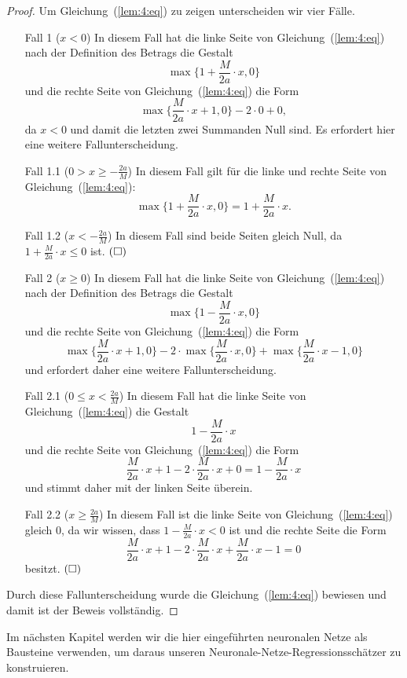 \begin{proof}
Um Gleichung~(\ref{lem:4:eq}) zu zeigen unterscheiden wir vier Fälle.
  \begin{itemize}
  \item[Fall 1] ($x < 0$) In diesem Fall hat die linke Seite von Gleichung~(\ref{lem:4:eq}) nach der Definition des Betrags die Gestalt $$\max\bigg\{1 + \frac{M}{2a} \cdot x, 0\bigg\}$$ und die rechte Seite von Gleichung~(\ref{lem:4:eq}) die Form $$\max\bigg\{\frac{M}{2a} \cdot x + 1, 0\bigg\} - 2 \cdot 0 + 0,$$ da $x < 0$ und damit die letzten zwei Summanden Null sind. Es erfordert hier eine weitere Fallunterscheidung.
 \item[Fall 1.1] ($0 > x \geq -\frac{2a}{M}$) In diesem Fall gilt für die linke und rechte Seite von Gleichung~(\ref{lem:4:eq}):
 $$\max\bigg\{1 + \frac{M}{2a} \cdot x, 0\bigg\} = 1 + \frac{M}{2a} \cdot x.$$
 \item[Fall 1.2] ($x < -\frac{2a}{M}$) In diesem Fall sind beide Seiten gleich Null, da $1 + \frac{M}{2a} \cdot x \leq 0$ ist. $\hfill(\square)$
  \item[Fall 2] ($x \geq 0$) In diesem Fall hat die linke Seite von Gleichung~(\ref{lem:4:eq}) nach der Definition des Betrags die Gestalt $$\max\bigg\{1 - \frac{M}{2a} \cdot x, 0\bigg\}$$ und die rechte Seite von Gleichung~(\ref{lem:4:eq}) die Form $$\max\bigg\{\frac{M}{2a} \cdot x + 1, 0\bigg\} - 2 \cdot \max\bigg\{\frac{M}{2a} \cdot x, 0\bigg\} + \max\bigg\{\frac{M}{2a} \cdot x - 1, 0\bigg\}$$ und erfordert daher eine weitere Fallunterscheidung.
 \item[Fall 2.1] ($0 \leq x < \frac{2a}{M}$) In diesem Fall hat die linke Seite von Gleichung~(\ref{lem:4:eq}) die Gestalt $$1 - \frac{M}{2a} \cdot x$$ und die rechte Seite von Gleichung~(\ref{lem:4:eq}) die Form $$\frac{M}{2a} \cdot x + 1 - 2 \cdot \frac{M}{2a} \cdot x + 0 = 1 - \frac{M}{2a} \cdot x$$ und stimmt daher mit der linken Seite überein.
 \item[Fall 2.2] ($x \geq \frac{2a}{M}$) In diesem Fall ist die linke Seite von Gleichung~(\ref{lem:4:eq}) gleich 0, da wir wissen, dass $1 - \frac{M}{2a} \cdot x < 0$ ist und die rechte Seite die Form $$\frac{M}{2a} \cdot x + 1 - 2 \cdot \frac{M}{2a} \cdot x + \frac{M}{2a} \cdot x - 1 = 0$$
 besitzt. $\hfill(\square)$
\end{itemize} 
Durch diese Fallunterscheidung wurde die Gleichung~(\ref{lem:4:eq}) bewiesen und damit ist der Beweis vollständig.
  \end{proof}
Im nächsten Kapitel werden wir die hier eingeführten neuronalen Netze als Bausteine verwenden, um daraus unseren Neuronale-Netze-Regressionsschätzer zu konstruieren.